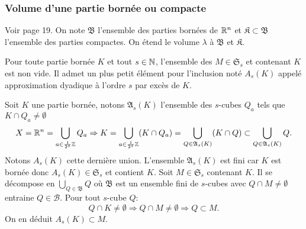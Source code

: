 \subsubsection{Volume d'une partie bornée ou compacte}
\noindent Voir page 19. On note $\mathfrak{B}$ l'ensemble des parties bornées  de $\mathbb{R}^n$ et $\mathfrak{K} \subset \mathfrak{B}$ l'ensemble des parties compactes. On étend le volume $\lambda$ à $\mathfrak{B}$ et $\mathfrak{K}$.
\begin{defi}
  Pour toute partie bornée $K$ et tout $s\in \mathbb{N}$, l'ensemble des $M\in \mathfrak{S}_s$ et contenant $K$ est non vide. Il admet un plus petit élément pour l'inclusion noté $A_s(K)$ appelé approximation dyadique à l'ordre $s$ par excès de $K$.
\end{defi}
\begin{demo}
Soit $K$  une partie bornée, notons $\mathfrak{A}_s(K)$ l'ensemble des $s$-cubes $Q_a$ tels que $K \cap Q_a \neq \emptyset$
\begin{displaymath}
 X = \mathbb{R}^n = \bigcup_{a\in \frac{1}{2^s}\mathbb{Z}}Q_a \Rightarrow K = \bigcup_{a\in \frac{1}{2^s}\mathbb{Z}}(K\cap Q_a)
   = \bigcup_{Q \in \mathfrak{A}_s(K)}(K \cap Q)
   \subset \bigcup_{Q \in \mathfrak{A}_s(K)} Q.
\end{displaymath}
Notons $A_s(K)$ cette dernière union. L'ensemble $\mathfrak{A}_s(K)$ est fini car $K$ est bornée donc $A_s(K)\in \mathfrak{S}_s$ et contient $K$.\newline
Soit $M  \in \mathfrak{S}_s$ contenant $K$. Il se décompose en $\bigcup_{Q \in \mathfrak{B}} Q$ où $\mathfrak{B}$ est un ensemble fini de $s$-cubes avec $Q \cap M \neq \emptyset$ entraine $Q \in \mathcal{B}$. Pour tout $s$-cube $Q$:
\begin{displaymath}
  Q \cap K \neq \emptyset \Rightarrow Q \cap M \neq \emptyset \Rightarrow Q \subset M.
\end{displaymath}
On en déduit $A_s(K) \subset M$.
\end{demo}


